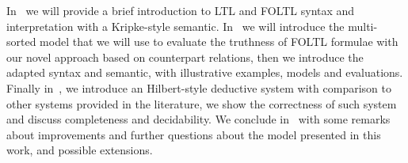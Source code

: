 In~ we will provide a brief introduction to \ac{LTL} and \ac{FOLTL} syntax and interpretation with a
Kripke-style semantic. In~ we will introduce the multi-sorted model that we will use to evaluate
the truthness of \ac{FOLTL} formulae with our novel approach based on counterpart relations, then we introduce the
adapted syntax and semantic, with illustrative examples, models and evaluations. Finally in~, we
introduce an Hilbert-style deductive system with comparison to other systems provided in the literature, we show the
correctness of such system and discuss completeness and decidability. We conclude in~ with some
remarks about improvements and further questions about the model presented in this work, and possible extensions.
